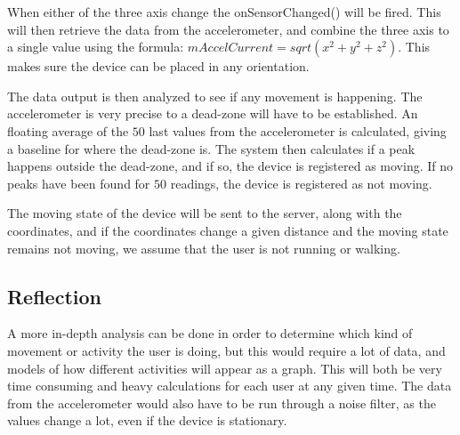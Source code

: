 When either of the three axis change the onSensorChanged() will be fired. This will then retrieve the data from the accelerometer, and combine the three axis to a single value using the formula: $mAccelCurrent = sqrt(x^2 + y^2 + z^2)$. This makes sure the device can be placed in any orientation.

The data output is then analyzed to see if any movement is happening. The accelerometer is very precise to a dead-zone will have to be established.
An floating average of the $50$ last values from the accelerometer is calculated, giving a baseline for where the dead-zone is.
The system then calculates if a peak happens outside the dead-zone, and if so, the device is registered as moving.
If no peaks have been found for $50$ readings, the device is registered as not moving.

The moving state of the device will be sent to the server, along with the coordinates, and if the coordinates change a given distance and the moving state remains not moving, we assume that the user is not running or walking.\cite{androidsensor}\cite{androidaccl}

\subsection{Reflection}
A more in-depth analysis can be done in order to determine which kind of movement or activity the user is doing, but this would require a lot of data, and models of how different activities will appear as a graph.
This will both be very time consuming and heavy calculations for each user at any given time. The data from the accelerometer would also have to be run through a noise filter, as the values change a lot, even if the device is stationary.